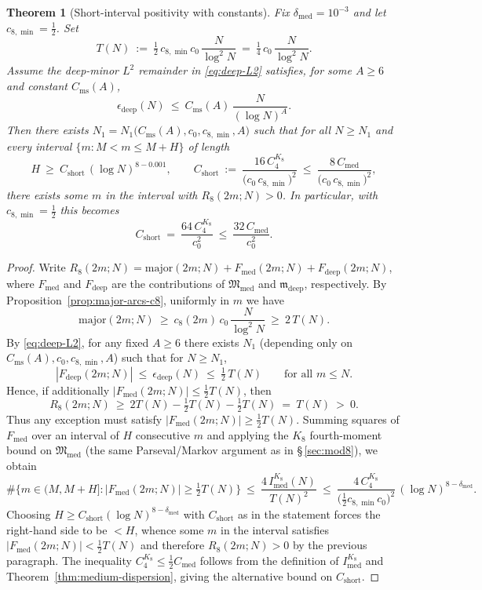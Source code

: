 \documentclass[11pt]{article}
\newtheorem{theorem}{Theorem}
\theoremstyle{definition}
\theoremstyle{remark}
\begin{document}
\begin{theorem}[Short-interval positivity with constants]\label{thm:short-interval-constants}
Fix $\delta_{\mathrm{med}}=10^{-3}$ and let $c_{8,\min}=\tfrac12$. Set
\[
  T(N)\ :=\ \tfrac12\,c_{8,\min}c_0\,\frac{N}{\log^2 N}\ =\ \tfrac14\,c_0\,\frac{N}{\log^2 N}.
\]
Assume the deep-minor $L^2$ remainder in \eqref{eq:deep-L2} satisfies, for some $A\ge 6$ and constant $C_{\mathrm{ms}}(A)$,
\[
  \epsilon_{\mathrm{deep}}(N)\ \le\ C_{\mathrm{ms}}(A)\,\frac{N}{(\log N)^A}.
\]
Then there exists $N_1= N_1\big(C_{\mathrm{ms}}(A),c_0,c_{8,\min},A\big)$ such that for all $N\ge N_1$ and every interval $\{m: M<m\le M+H\}$ of length
\[
  H\ \ge\ C_{\mathrm{short}}\,(\log N)^{8-0.001},\qquad C_{\mathrm{short}}\ :=\ \frac{16\,C_4^{K_8}}{\big(c_0\,c_{8,\min}\big)^2}\ \le\ \frac{8\,C_{\mathrm{med}}}{\big(c_0\,c_{8,\min}\big)^2},
\]
there exists some $m$ in the interval with $R_8(2m;N)>0$. In particular, with $c_{8,\min}=\tfrac12$ this becomes
\[
  C_{\mathrm{short}}\ =\ \frac{64\,C_4^{K_8}}{c_0^2}\ \le\ \frac{32\,C_{\mathrm{med}}}{c_0^2}.
\]
\end{theorem}

\begin{proof}
Write $R_8(2m;N)=\mathrm{major}(2m;N)+F_{\mathrm{med}}(2m;N)+F_{\mathrm{deep}}(2m;N)$, where $F_{\mathrm{med}}$ and $F_{\mathrm{deep}}$ are the contributions of $\mathfrak M_{\mathrm{med}}$ and $\mathfrak m_{\mathrm{deep}}$, respectively. By Proposition~\ref{prop:major-arcs-c8}, uniformly in $m$ we have
\[
  \mathrm{major}(2m;N)\ \ge\ c_8(2m)\,c_0\,\frac{N}{\log^2 N}\ \ge\ 2\,T(N).
\]
By \eqref{eq:deep-L2}, for any fixed $A\ge 6$ there exists $N_1$ (depending only on $C_{\mathrm{ms}}(A),c_0,c_{8,\min},A$) such that for $N\ge N_1$,
\[
  |F_{\mathrm{deep}}(2m;N)|\ \le\ \epsilon_{\mathrm{deep}}(N)\ \le\ \tfrac12\,T(N)\qquad\text{for all }m\le N.
\]
Hence, if additionally $|F_{\mathrm{med}}(2m;N)|\le \tfrac12 T(N)$, then
\[
  R_8(2m;N)\ \ge\ 2T(N)-\tfrac12T(N)-\tfrac12T(N)\ =\ T(N)\ >\ 0.
\]
Thus any exception must satisfy $|F_{\mathrm{med}}(2m;N)|\ge \tfrac12 T(N)$. Summing squares of $F_{\mathrm{med}}$ over an interval of $H$ consecutive $m$ and applying the $K_8$ fourth-moment bound on $\mathfrak M_{\mathrm{med}}$ (the same Parseval/Markov argument as in \S\,\ref{sec:mod8}), we obtain
\[
  \#\Big\{m\in(M,M{+}H]: |F_{\mathrm{med}}(2m;N)|\ge \tfrac12 T(N)\Big\}\ \le\ \frac{4\,I_{\mathrm{med}}^{K_8}(N)}{T(N)^2}
  \ \le\ \frac{4\,C_4^{K_8}}{\big(\tfrac12 c_{8,\min}c_0\big)^2}\,(\log N)^{8-\delta_{\mathrm{med}}}.
\]
Choosing $H\ge C_{\mathrm{short}}(\log N)^{8-\delta_{\mathrm{med}}}$ with $C_{\mathrm{short}}$ as in the statement forces the right-hand side to be $<H$, whence some $m$ in the interval satisfies $|F_{\mathrm{med}}(2m;N)|<\tfrac12T(N)$ and therefore $R_8(2m;N)>0$ by the previous paragraph. The inequality $C_4^{K_8}\le \tfrac12 C_{\mathrm{med}}$ follows from the definition of $I_{\mathrm{med}}^{K_8}$ and Theorem~\ref{thm:medium-dispersion}, giving the alternative bound on $C_{\mathrm{short}}$.
\end{proof}
\end{document}
